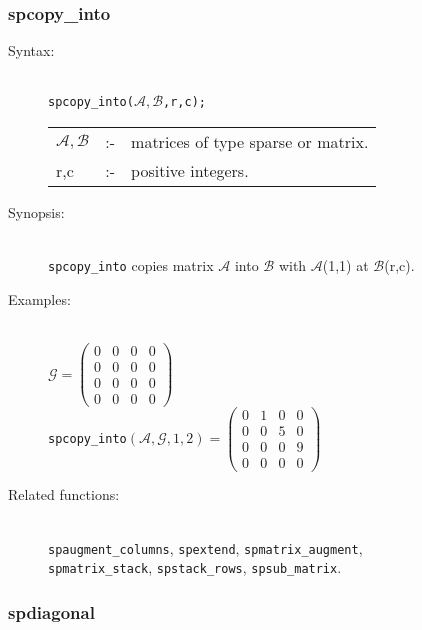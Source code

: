 \subsubsection{spcopy\_into}
\label{sparse:spcopy_into}
\hypertarget{operator:SPCOPY_INTO}{}

\begin{description}
\item[Syntax:]\mbox{}\\
\texttt{spcopy\_into($\mathcal{A,B}$,r,c);}\\[2mm]
\begin{tabular}{l l l}
$\mathcal{A,B}$ &:-& matrices of type sparse or matrix. \\
r,c          &:-& positive integers.
\end{tabular}

\item[Synopsis:]\mbox{}\\
 \texttt{spcopy\_into} copies matrix $\mathcal{A}$ into
                $\mathcal{B}$ with $\mathcal{A}$(1,1) at $\mathcal{B}$(r,c).

\item[Examples:]\mbox{}\\
\(\mathcal{G} = \begin{pmatrix} 0 & 0 & 0 & 0 \\ 0 & 0 & 0 & 0 \\
0 & 0 & 0 & 0 \\ 0 & 0 & 0 & 0
\end{pmatrix}\) \\[2mm]
\texttt{spcopy\_into}\((\mathcal{A,G},1,2)  =
\begin{pmatrix} 0 & 1 & 0 & 0 \\ 0 & 0 & 5 & 0 \\ 0 & 0 & 0
& 9 \\ 0 & 0 & 0 & 0
\end{pmatrix}\)

\item[Related functions:]\mbox{}\\
\texttt{spaugment\_columns}, \texttt{spextend}, \texttt{spmatrix\_augment},\\
\texttt{spmatrix\_stack}, \texttt{spstack\_rows}, \texttt{spsub\_matrix}.
\end{description}


\subsubsection{spdiagonal}
\label{sparse:spdiagonal}
\hypertarget{operator:SPDIAGONAL}{}

